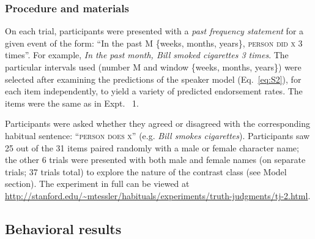 \documentclass[10pt,letterpaper]{article}
\newcommand{\ndg}[1]{\textcolor{Green}{[ndg: #1]}}
\begin{document}
\subsubsection{Procedure and materials}

On each trial, participants were presented with a \emph{past frequency statement} for a given event of the form: ``In the past M \{weeks, months, years\}, \textsc{person} \textsc{did x} 3 times''.
For example, \emph{In the past month, Bill smoked cigarettes 3 times}.
The particular intervals used (number M and window \{weeks, months, years\}) were selected after examining the predictions of the speaker model (Eq.~\ref{eq:S2}), for each item independently, to yield a variety of predicted endorsement rates.
The items were the same as in Expt. ~1.

Participants were asked whether they agreed or disagreed with the corresponding habitual sentence: ``\textsc{person does x}'' (e.g. \emph{Bill smokes cigarettes}).
Participants saw 25 out of the 31 items paired randomly with a male or female character name; the other 6 trials were presented with both male and female names (on separate trials; 37 trials total) to explore the nature of the contrast class (see Model section). 
The experiment in full can be viewed at \url{http://stanford.edu/~mtessler/habituals/experiments/truth-judgments/tj-2.html}.



\subsection{Behavioral results}
\end{document}
